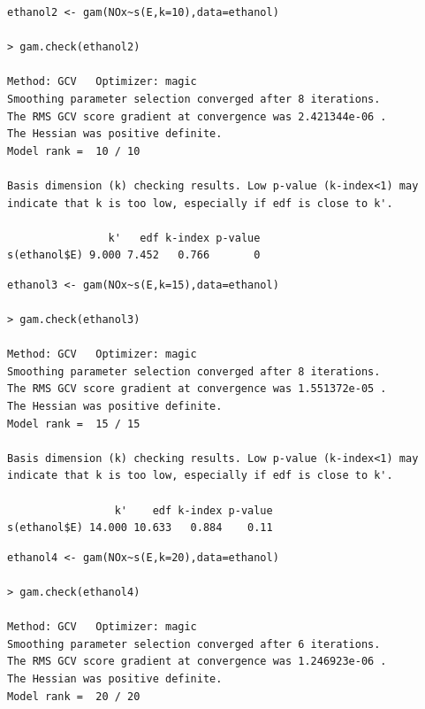 \documentclass{BeamerTemplate}
\begin{document}
\begin{refsection}
\begin{frame}[fragile]{}

{\scriptsize
\begin{verbatim}
ethanol2 <- gam(NOx~s(E,k=10),data=ethanol)

> gam.check(ethanol2)

Method: GCV   Optimizer: magic
Smoothing parameter selection converged after 8 iterations.
The RMS GCV score gradient at convergence was 2.421344e-06 .
The Hessian was positive definite.
Model rank =  10 / 10 

Basis dimension (k) checking results. Low p-value (k-index<1) may
indicate that k is too low, especially if edf is close to k'.

                k'   edf k-index p-value
s(ethanol$E) 9.000 7.452   0.766       0
\end{verbatim}
}

\end{frame}

\begin{frame}[fragile]{}

{\scriptsize
\begin{verbatim}
ethanol3 <- gam(NOx~s(E,k=15),data=ethanol)

> gam.check(ethanol3)

Method: GCV   Optimizer: magic
Smoothing parameter selection converged after 8 iterations.
The RMS GCV score gradient at convergence was 1.551372e-05 .
The Hessian was positive definite.
Model rank =  15 / 15 

Basis dimension (k) checking results. Low p-value (k-index<1) may
indicate that k is too low, especially if edf is close to k'.

                 k'    edf k-index p-value
s(ethanol$E) 14.000 10.633   0.884    0.11

\end{verbatim}
}
\end{frame}


\begin{frame}[fragile]{}

{\scriptsize
\begin{verbatim}
ethanol4 <- gam(NOx~s(E,k=20),data=ethanol)

> gam.check(ethanol4)

Method: GCV   Optimizer: magic
Smoothing parameter selection converged after 6 iterations.
The RMS GCV score gradient at convergence was 1.246923e-06 .
The Hessian was positive definite.
Model rank =  20 / 20 


\end{verbatim}}
\end{frame}
\end{refsection}
\end{document}
